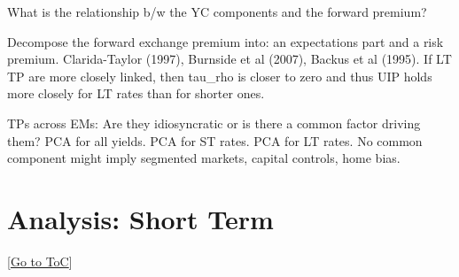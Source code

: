 \documentclass[12pt]{article}
\newcommand{\gototoc}{\vspace{-1.8cm} \null\hfill [\hyperlink{toc}{Go to ToC}] \newline}
\newcommand{\cmark}{\ding{51}}
\newcommand{\done}{\rlap{$\square$}{\raisebox{2pt}{\large\hspace{1pt}\cmark}}%
	\hspace{-2.5pt}}
\begin{document}
\begin{todolist}
	\item What is the relationship b/w the YC components and the forward premium?
	\item Decompose the forward exchange premium into: an expectations part and a risk premium. Clarida-Taylor (1997), Burnside et al (2007), Backus et al (1995). If LT TP are more closely linked, then tau_rho is closer to zero and thus UIP holds more closely for LT rates than for shorter ones.
	\item[\done] TPs across EMs: Are they idiosyncratic or is there a common factor driving them? PCA for all yields. PCA for ST rates. PCA for LT rates. No common component might imply segmented markets, capital controls, home bias.
\end{todolist}

\section{Analysis: Short Term}
\gototoc
\end{document}
